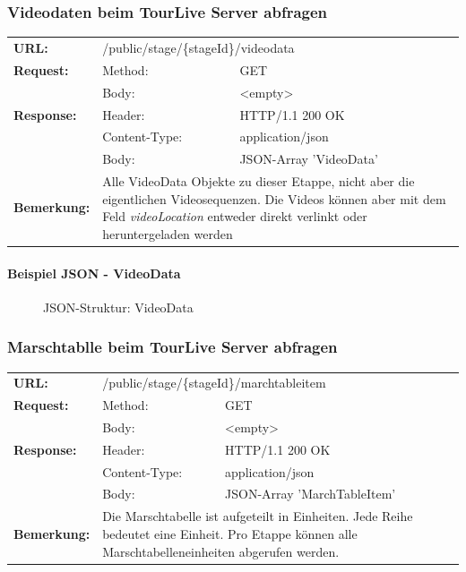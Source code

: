 \subsubsection{Videodaten beim TourLive Server abfragen}	
\begin{longtable}{ p{2.5cm} p{3.5cm} p{6cm}}
	\textbf{URL:} & \multicolumn{2}{l}{/public/stage/\{stageId\}/videodata} \\
	\textbf{Request:} & Method: & GET \\
		& Body: & <empty>\\
	\textbf{Response:} &  Header: & HTTP/1.1 200 OK \\
		& Content-Type: & application/json \\
		& Body: & JSON-Array 'VideoData'\\
	\textbf{Bemerkung:} & \multicolumn{2}{p{10cm}}{Alle VideoData Objekte zu dieser Etappe, nicht aber die eigentlichen Videosequenzen. Die Videos können aber mit dem Feld \textit{videoLocation} entweder direkt verlinkt oder heruntergeladen werden}
\end{longtable}

\paragraph{Beispiel JSON - VideoData}
\begin{figure}[H]
	\centering
	
	\caption{JSON-Struktur: VideoData}
\end{figure}

\subsubsection{Marschtablle beim TourLive Server abfragen}
\begin{longtable}{ p{2.5cm} p{3.5cm} p{6cm}}
	\textbf{URL:} & \multicolumn{2}{l}{/public/stage/\{stageId\}/marchtableitem} \\
	\textbf{Request:} & Method: & GET \\
		& Body: & <empty>\\
	\textbf{Response:} &  Header: & HTTP/1.1 200 OK \\
		& Content-Type: & application/json \\
		& Body: & JSON-Array 'MarchTableItem'\\
	\textbf{Bemerkung:} & \multicolumn{2}{p{10cm}}{Die Marschtabelle ist aufgeteilt in Einheiten. Jede Reihe bedeutet eine Einheit. Pro Etappe können alle Marschtabelleneinheiten abgerufen werden.}
\end{longtable}

